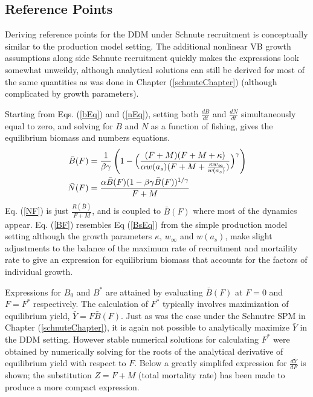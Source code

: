%
\subsection{Reference Points}

%
Deriving reference points for the DDM under Schnute recruitment is
conceptually similar to the production model setting. The additional nonlinear
VB growth assumptions along side Schnute recruitment quickly makes the
expressions look somewhat unweildy, although analytical solutions can still be
derived for most of the same quantities as was done in Chapter (\ref{schnuteChapter}) 
(although complicated by growth parameters).

%
Starting from Eqs. (\ref{bEq}) and (\ref{nEq}), setting both $\frac{dB}{dt}$
and $\frac{dN}{dt}$ simultaneously equal to zero, and solving for $B$ and $N$
as a function of fishing, gives the equilibrium biomass and numbers equations.
%
\begin{align}
\bar{B}(F) &= \frac{1}{\beta\gamma} \left( 1 - \Big(\frac{(F + M) (F + M + \kappa)}{\alpha w(a_s)(F + M + \frac{\kappa w_\infty}{w(a_s)})}\Big)^\gamma\right) \label{BF}\\
\bar{N}(F) &= \frac{\alpha\bar{B}(F)(1-\beta\gamma\bar{B}(F))^{1/\gamma}}{F+M} \label{NF}
\end{align}
%
Eq. (\ref{NF}) is just $\frac{R(\bar{B})}{F+M}$, and is coupled to $\bar{B}(F)$
where most of the dynamics appear. Eq. (\ref{BF}) resembles Eq (\ref{BsEq})
from the simple production model setting although the growth parameters
$\kappa$, $w_\infty$ and $w(a_s)$, make slight adjustments to the balance of the
maximum rate of recruitment and mortaility rate to give an expression for
equilibrium biomass that accounts for the factors of individual growth.

%
Expressions for $B_0$ and $B^*$ are attained by evaluating $\bar{B}(F)$ at
$F=0$ and $F=F^*$ respectively. The calculation of $F^*$ typically involves %
maximization of equilibrium yield, \mbox{$\bar{Y} = F\bar{B}(F)$.} Just as was 
the case under the Schnutre SPM in Chapter (\ref{schnuteChapter}), it is again not
possible to analytically maximize $\bar{Y}$ in the DDM setting. However stable 
numerical solutions for calculating $F^*$ were obtained by numerically solving 
for the roots of the analytical derivative of equilibrium yield with respect to $F$. Below a greatly
simplifed expression for $\frac{d \bar{Y}}{dF}$ is shown; the substitution
$Z=F+M$ (total mortality rate) has been made to produce a more compact expression.

